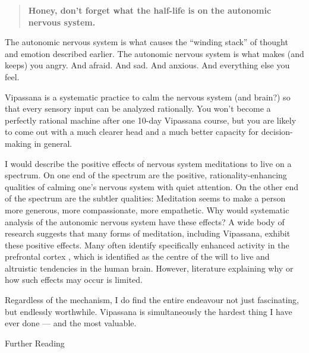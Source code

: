 \documentclass{article}
\begin{document}
\begin{quote}
  \textbf{Honey, don’t forget what the half-life is on the autonomic nervous system.}
\end{quote}

The autonomic nervous system is what causes the ``winding stack'' of thought and emotion described earlier. The autonomic nervous system is what makes (and keeps) you angry. And afraid. And sad. And anxious. And everything else you feel.

Vipassana is a systematic practice to calm the nervous system (and brain?) so that every sensory input can be analyzed rationally. You won't become a perfectly rational machine after one 10-day Vipassana course, but you are likely to come out with a much clearer head and a much better capacity for decision-making in general.

I would describe the positive effects of nervous system meditations to live on a spectrum. On one end of the spectrum are the positive, rationality-enhancing qualities of calming one's nervous system with quiet attention. On the other end of the spectrum are the subtler qualities: Meditation seems to make a person more generous, more compassionate, more empathetic. Why would systematic analysis of the autonomic nervous system have these effects? A wide body of research suggests that many forms of meditation, including Vipassana, exhibit these positive effects. Many often identify specifically enhanced activity in the prefrontal cortex \cite{differentialengagement, meditationbrainstructure}, which is identified as the centre of the will to live and altruistic tendencies in the human brain.\cite{personalityneuroscience} However, literature explaining why or how such effects may occur is limited.

Regardless of the mechanism, I do find the entire endeavour not just fascinating, but endlessly worthwhile. Vipassana is simultaneously the hardest thing I have ever done --- and the most valuable.


\pagebreak

\begin{center}
  \Huge{Further Reading}
\end{center}

\vspace{1cm}
\end{document}
